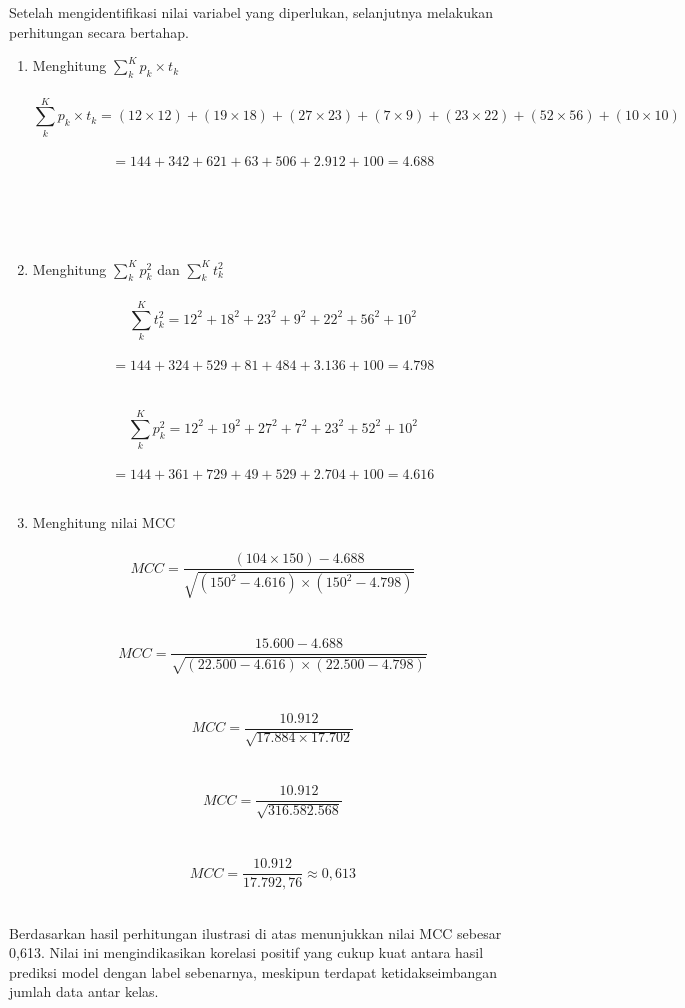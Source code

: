 Setelah mengidentifikasi nilai variabel yang diperlukan, selanjutnya melakukan 
perhitungan secara bertahap.

\begin{enumerate}[noitemsep]
    \item Menghitung $\sum_{k}^{K} p_k \times t_k$ \\ \\
    $$\sum_{k}^{K} p_k \times t_k = (12 \times 12) + (19 \times 18) + (27 \times 23) + (7 \times 9) + (23 \times 22) + (52 \times 56) + (10 \times 10)$$ \\
    $$= 144 + 342 + 621 + 63 + 506 + 2.912 + 100 = 4.688$$ \\ \\ \\ \\

    \item Menghitung $\sum_{k}^{K} p_k^2$ dan $\sum_{k}^{K} t_k^2$ \\ \\
    $$\sum_{k}^{K} t_k^2 = 12^2 + 18^2 + 23^2 + 9^2 + 22^2 + 56^2 + 10^2$$ \\
    $$= 144 + 324 + 529 + 81 + 484 + 3.136 + 100 = 4.798$$ \\ \\

    $$\sum_{k}^{K} p_k^2 = 12^2 + 19^2 + 27^2 + 7^2 + 23^2 + 52^2 + 10^2$$ \\
    $$= 144 + 361 + 729 + 49 + 529 + 2.704 + 100 = 4.616$$ \\

    \item Menghitung nilai MCC \\ \\
    $$MCC = \frac{(104 \times 150) - 4.688}{\sqrt{(150^2 - 4.616) \times (150^2 - 4.798)}}$$ \\ \\
    $$MCC = \frac{15.600 - 4.688}{\sqrt{(22.500 - 4.616) \times (22.500 - 4.798)}}$$ \\ \\ 
    $$MCC = \frac{10.912}{\sqrt{17.884 \times 17.702}}$$ \\ \\
    $$MCC = \frac{10.912}{\sqrt{316.582.568}}$$ \\ \\
    $$MCC = \frac{10.912}{17.792,76} \approx 0,613$$ \\
\end{enumerate} \par

Berdasarkan hasil perhitungan ilustrasi di atas menunjukkan nilai MCC sebesar 
0,613. Nilai ini mengindikasikan korelasi positif yang cukup kuat antara hasil 
prediksi model dengan label sebenarnya, meskipun terdapat ketidakseimbangan 
jumlah data antar kelas. \par